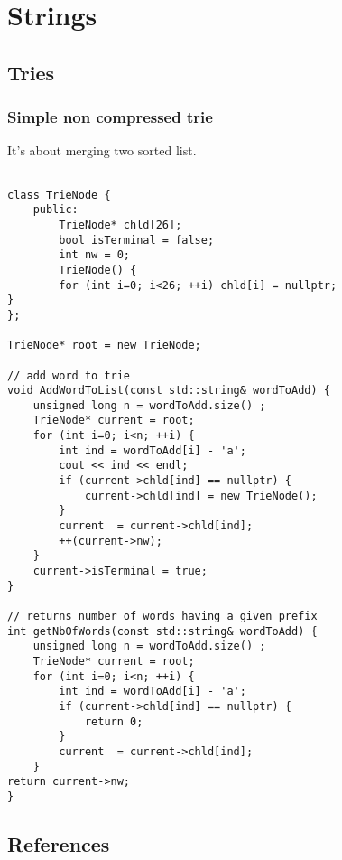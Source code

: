 \chapter{Strings}
\section{Tries}

\subsection{Simple non compressed trie}

It's about merging two sorted list.

\color{blue}
\begin{lstlisting}

class TrieNode {
	public:
		TrieNode* chld[26];
		bool isTerminal = false;
		int nw = 0;
		TrieNode() {
		for (int i=0; i<26; ++i) chld[i] = nullptr;
}
};

TrieNode* root = new TrieNode;

// add word to trie
void AddWordToList(const std::string& wordToAdd) {
	unsigned long n = wordToAdd.size() ;
	TrieNode* current = root;
	for (int i=0; i<n; ++i) {
		int ind = wordToAdd[i] - 'a';
		cout << ind << endl;
		if (current->chld[ind] == nullptr) {
			current->chld[ind] = new TrieNode();
		}
		current  = current->chld[ind];
		++(current->nw);
	}
	current->isTerminal = true;
}

// returns number of words having a given prefix
int getNbOfWords(const std::string& wordToAdd) {
	unsigned long n = wordToAdd.size() ;
	TrieNode* current = root;
	for (int i=0; i<n; ++i) {
		int ind = wordToAdd[i] - 'a';
		if (current->chld[ind] == nullptr) {
			return 0;
		}
		current  = current->chld[ind];
	}
return current->nw;
}\end{lstlisting}
\color{black}
\section{References}

